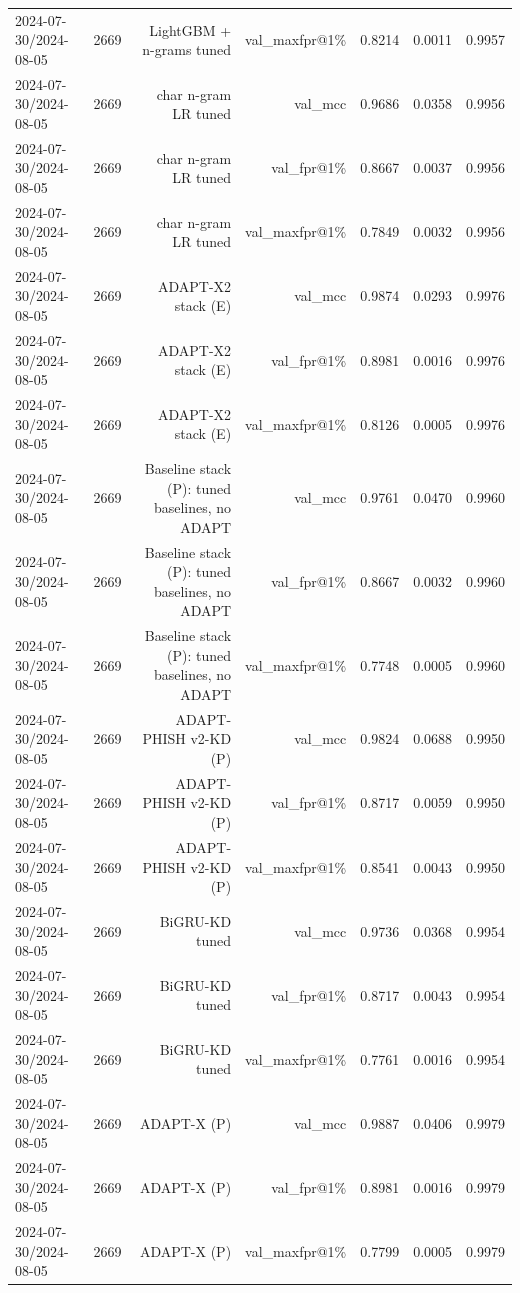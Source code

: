\begin{table}[t]
\begin{tabular}{llrrrrr}
2024-07-30/2024-08-05 & 2669 & LightGBM + n-grams tuned & val\_maxfpr@1\% & 0.8214 & 0.0011 & 0.9957 \\
2024-07-30/2024-08-05 & 2669 & char n-gram LR tuned & val\_mcc & 0.9686 & 0.0358 & 0.9956 \\
2024-07-30/2024-08-05 & 2669 & char n-gram LR tuned & val\_fpr@1\% & 0.8667 & 0.0037 & 0.9956 \\
2024-07-30/2024-08-05 & 2669 & char n-gram LR tuned & val\_maxfpr@1\% & 0.7849 & 0.0032 & 0.9956 \\
2024-07-30/2024-08-05 & 2669 & ADAPT-X2 stack (E) & val\_mcc & 0.9874 & 0.0293 & 0.9976 \\
2024-07-30/2024-08-05 & 2669 & ADAPT-X2 stack (E) & val\_fpr@1\% & 0.8981 & 0.0016 & 0.9976 \\
2024-07-30/2024-08-05 & 2669 & ADAPT-X2 stack (E) & val\_maxfpr@1\% & 0.8126 & 0.0005 & 0.9976 \\
2024-07-30/2024-08-05 & 2669 & Baseline stack (P): tuned baselines, no ADAPT & val\_mcc & 0.9761 & 0.0470 & 0.9960 \\
2024-07-30/2024-08-05 & 2669 & Baseline stack (P): tuned baselines, no ADAPT & val\_fpr@1\% & 0.8667 & 0.0032 & 0.9960 \\
2024-07-30/2024-08-05 & 2669 & Baseline stack (P): tuned baselines, no ADAPT & val\_maxfpr@1\% & 0.7748 & 0.0005 & 0.9960 \\
2024-07-30/2024-08-05 & 2669 & ADAPT-PHISH v2-KD (P) & val\_mcc & 0.9824 & 0.0688 & 0.9950 \\
2024-07-30/2024-08-05 & 2669 & ADAPT-PHISH v2-KD (P) & val\_fpr@1\% & 0.8717 & 0.0059 & 0.9950 \\
2024-07-30/2024-08-05 & 2669 & ADAPT-PHISH v2-KD (P) & val\_maxfpr@1\% & 0.8541 & 0.0043 & 0.9950 \\
2024-07-30/2024-08-05 & 2669 & BiGRU-KD tuned & val\_mcc & 0.9736 & 0.0368 & 0.9954 \\
2024-07-30/2024-08-05 & 2669 & BiGRU-KD tuned & val\_fpr@1\% & 0.8717 & 0.0043 & 0.9954 \\
2024-07-30/2024-08-05 & 2669 & BiGRU-KD tuned & val\_maxfpr@1\% & 0.7761 & 0.0016 & 0.9954 \\
2024-07-30/2024-08-05 & 2669 & ADAPT-X (P) & val\_mcc & 0.9887 & 0.0406 & 0.9979 \\
2024-07-30/2024-08-05 & 2669 & ADAPT-X (P) & val\_fpr@1\% & 0.8981 & 0.0016 & 0.9979 \\
2024-07-30/2024-08-05 & 2669 & ADAPT-X (P) & val\_maxfpr@1\% & 0.7799 & 0.0005 & 0.9979 \\

\end{tabular}
\end{table}

